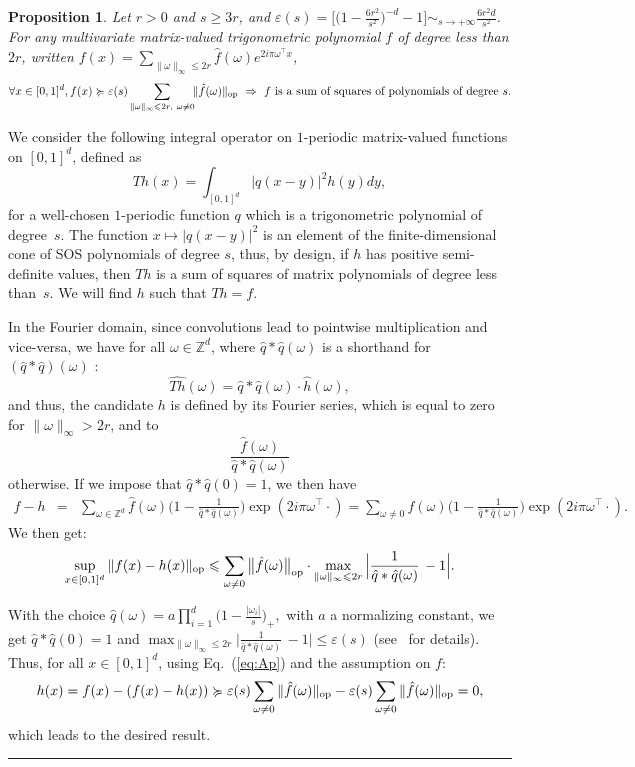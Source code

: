 \documentclass[11pt]{article}
\newcommand{\BEAS}{\begin{eqnarray*}}
\newcommand{\EEAS}{\end{eqnarray*}}
\newcommand{\BEQ}{\begin{equation}}
\newcommand{\EEQ}{\end{equation}}
\newcommand{\zb}{\mathbb{Z}}
\newcommand{\BlackBox}{\rule{1.5ex}{1.5ex}}  %
\newenvironment{proof}{\par\noindent{\bf Proof\ }}{\hfill\BlackBox\\[2mm]}
\newtheorem{proposition}{Proposition}
\newcommand{\eq}[1]{Eq.~(\ref{eq:#1})}
\def \ds{\displaystyle}
\begin{document}
\begin{proposition}
\label{theo:nocond}
Let $r>0$ and $s \geqslant 3r$, and $\varepsilon(s) = \big[  \big( 1 - \frac{6r^2}{s^2} \big)^{-d} - 1 \big] \sim_{s \to +\infty}    \frac{ 6 r^2 d }{s^2}$.
For any multivariate matrix-valued trigonometric polynomial $f$ of degree less than $2r$, written
$f(x) = \sum_{\| \omega \|_\infty \leqslant 2r} \hat{f}(\omega) e^{2i\pi \omega^\top x}$,
\[
\forall x \in [0,1]^d, f(x) \succcurlyeq \varepsilon(s) \sum_{\| \omega \|_\infty \leqslant 2r, \ \omega \neq 0}\!\! \| \hat{f}(\omega)  \|_{\rm op} \ \Rightarrow \  f  \ \mbox{is a sum of squares of polynomials of degree } s.
\]
\end{proposition}
\begin{proof}
 We consider the following integral operator on $1$-periodic  matrix-valued functions on $ [0,1]^d$, defined as 
 \BEQ
 \label{eq:Th}
 Th(x) = \int_{[0, 1]^d} |q(x-y)|^2 h(y) dy,
 \EEQ
 for a well-chosen $1$-periodic function $ q$ which is a trigonometric polynomial of degree~$ s$. 
 {The function $x \mapsto |q(x-y)|^2$ is an element of the finite-dimensional cone of SOS polynomials of degree $s$, thus,} by design, if $ h$ has positive semi-definite values, then $ Th$ is a sum of squares of matrix polynomials of degree less than~$ s$. We will find $ h$ such that $ Th = f  $.
 
 In the Fourier domain, since convolutions lead to pointwise multiplication and vice-versa, we have for all $\omega \in \zb^d$, where $\hat{q} \ast \hat{q}(\omega)$ is a shorthand for $(\hat{q} \ast \hat{q})(\omega)$ : 
\[
\widehat{Th}(\omega) = \hat{q} \ast \hat{q}(\omega) \cdot \hat{h}(\omega),
\]
 and thus, the candidate $ h$ is defined by its Fourier series, which is equal to zero for $ \| \omega\|_\infty > 2r$, and to 
 \[ \frac{\hat{f}(\omega) }{ \hat{q}  \ast \hat{q}(\omega)}\]
  otherwise. If we impose that $ \hat{q}  \ast \hat{q}(0)=1$, we then have 
\BEAS
   f  -  h &  = &    \sum_{\omega  \in \zb^d} \hat{f}(\omega) \Big(  1  - \frac{1}{\hat{q} \ast \hat{q}(\omega)} \Big) \exp( 2i \pi \omega^\top \cdot) =    \sum_{\omega  \neq 0 } \hat{f}(\omega) \Big(  1  - \frac{1}{\hat{q} \ast \hat{q}(\omega)} \Big) \exp( 2i \pi \omega^\top \cdot) .\EEAS
 We then get:
\BEQ
\label{eq:Ap} \sup_{x \in [0,1]^d} \| f(x)  - h(x)\|_{\rm op}
 \leqslant    \sum_{\omega  \neq 0} 
\big\| \hat{f}(\omega)  \big\|_{\rm op}
\cdot  \max_{ \|\omega\|_\infty \leqslant 2r}  \Big|   \frac{1}{\hat{q} \ast \hat{q}(\omega)}  \, - 1\Big| .\EEQ

With the choice 
$\ds  \hat{q}(\omega) = a \prod_{i=1}^d \Big( 1 - \frac{|\omega_i|}{s} \Big)_+, $
with $a$ a normalizing constant, we get $ \hat{q}\ast \hat{q}(0)=1$ and
$ \max_{ \|\omega\|_\infty \leqslant 2r}  \big|   \frac{1}{\hat{q} \ast \hat{q}(\omega)}  \, - 1\big| \leqslant \varepsilon(s)$ (see~\cite{bach2022exponential} for details). Thus, for all $x \in [0,1]^d$, using \eq{Ap} and the assumption on $f$:
\[
h(x) = f(x) - ( f(x) - h(x)) \succcurlyeq 
 \varepsilon(s) \sum_{ \omega \neq 0} \| \hat{f}(\omega)  \|_{\rm op}
 -  \varepsilon(s) \sum_{ \omega \neq 0} \| \hat{f}(\omega)  \|_{\rm op} = 0,
\]
which leads to the desired result.
 \end{proof}
 
\end{document}
